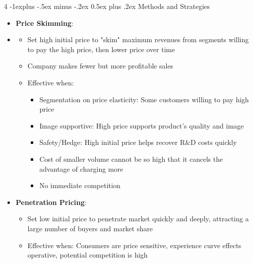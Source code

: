 \documentclass[10pt, landscape]{article}
\makeatletter
\renewcommand{\subsection}{\@startsection{subsection}{2}{0mm}%
  {-1explus -.5ex minus -.2ex}%
  {0.5ex plus .2ex}%
{\normalfont\normalsize\bfseries}}
\makeatother
\begin{document}
\begin{multicols*}{4}
  \subsection{Methods and Strategies}
  \begin{itemize}
    \item \textbf{Price Skimming}:
    \item \begin{itemize}
      \item Set high initial price to "skim" maximum revenues from segments willing to pay the high price, then lower price over time
      \item Company makes fewer but more profitable sales
      \item Effective when:
      \begin{itemize}
        \item Segmentation on price elasticity: Some customers willing to pay high price
        \item Image supportive: High price supports product's quality and image
        \item Safety/Hedge: High initial price helps recover R\&D costs quickly
        \item Cost of smaller volume cannot be so high that it cancels the advantage of charging more
        \item No immediate competition
      \end{itemize}
    \end{itemize}
    \item \textbf{Penetration Pricing}:
      \begin{itemize}
        \item Set low initial price to penetrate market quickly and deeply, attracting a large number of buyers and market share
        \item Effective when: Consumers are price sensitive, experience curve effects operative, potential competition is high
      \end{itemize}
    

\end{itemize}
\end{multicols*}
\end{document}
